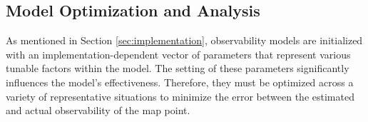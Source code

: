 \subsection{Model Optimization and Analysis}

As mentioned in Section \ref{sec:implementation}, observability models are initialized with an implementation-dependent vector of parameters that represent various tunable factors within the model. The setting of these parameters significantly influences the model's effectiveness. Therefore, they must be optimized across a variety of representative situations to minimize the error between the estimated and actual observability of the map point. 

\subsubsection{}